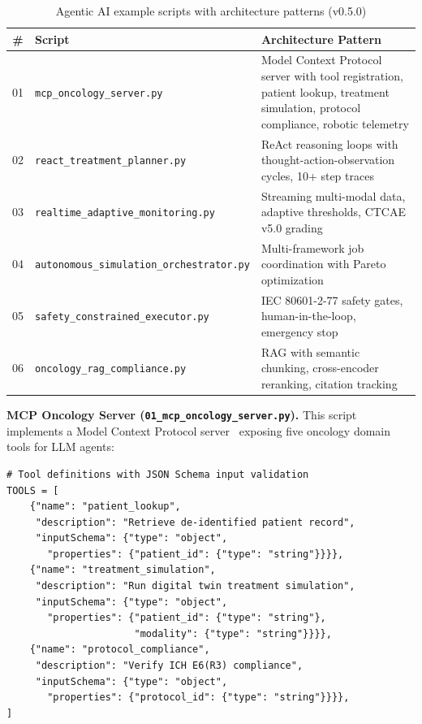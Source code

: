 \begin{table}[H]
\centering
\caption{Agentic AI example scripts with architecture patterns (v0.5.0)}
\label{tab:agentic}
\small
\begin{tabular}{@{}clp{5cm}@{}}
\toprule
\textbf{\#} & \textbf{Script} & \textbf{Architecture Pattern} \\
\midrule
01 & \texttt{mcp\_oncology\_server.py} & Model Context Protocol server with tool registration, patient lookup, treatment simulation, protocol compliance, robotic telemetry \\
02 & \texttt{react\_treatment\_planner.py} & ReAct reasoning loops with thought-action-observation cycles, 10+ step traces \\
03 & \texttt{realtime\_adaptive\_monitoring.py} & Streaming multi-modal data, adaptive thresholds, CTCAE v5.0 grading \\
04 & \texttt{autonomous\_simulation\_orchestrator.py} & Multi-framework job coordination with Pareto optimization \\
05 & \texttt{safety\_constrained\_executor.py} & IEC 80601-2-77 safety gates, human-in-the-loop, emergency stop \\
06 & \texttt{oncology\_rag\_compliance.py} & RAG with semantic chunking, cross-encoder reranking, citation tracking \\
\bottomrule
\end{tabular}
\end{table}

\textbf{MCP Oncology Server (\texttt{01\_mcp\_oncology\_server.py}).} This script implements a Model Context Protocol server~\cite{mcp2025} exposing five oncology domain tools for LLM agents:

\begin{lstlisting}[caption={MCP tool registration pattern from \texttt{01\_mcp\_oncology\_server.py} (v0.5.0)}]
# Tool definitions with JSON Schema input validation
TOOLS = [
    {"name": "patient_lookup",
     "description": "Retrieve de-identified patient record",
     "inputSchema": {"type": "object",
       "properties": {"patient_id": {"type": "string"}}}},
    {"name": "treatment_simulation",
     "description": "Run digital twin treatment simulation",
     "inputSchema": {"type": "object",
       "properties": {"patient_id": {"type": "string"},
                      "modality": {"type": "string"}}}},
    {"name": "protocol_compliance",
     "description": "Verify ICH E6(R3) compliance",
     "inputSchema": {"type": "object",
       "properties": {"protocol_id": {"type": "string"}}}},
]
\end{lstlisting}

